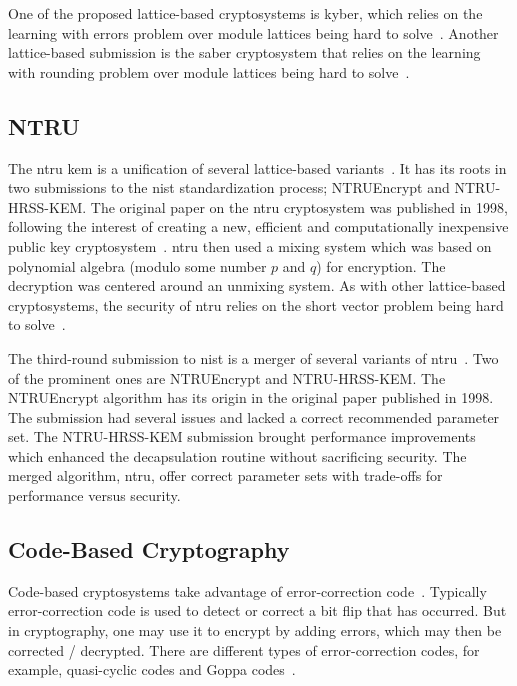 One of the proposed lattice-based cryptosystems is \gls{kyber}, which relies on the learning with errors problem over module lattices being hard to solve~\cite{kyber2021}. Another lattice-based submission is the \gls{saber} cryptosystem that relies on the learning with rounding problem over module lattices being hard to solve~\cite{saber}.

\subsection{NTRU}

The \gls{ntru} \gls{kem} is a unification of several lattice-based variants~\cite{ntru2020}. It has its roots in two submissions to the \gls{nist} standardization process; NTRUEncrypt and NTRU-HRSS-KEM. The original paper on the \gls{ntru} cryptosystem was published in 1998, following the interest of creating a new, efficient and computationally inexpensive public key cryptosystem~\cite{ntru1998}. \gls{ntru} then used a mixing system which was based on polynomial algebra (modulo some number $p$ and $q$) for encryption. The decryption was centered around an unmixing system. As with other lattice-based cryptosystems, the security of \gls{ntru} relies on the short vector problem being hard to solve~\cite{sun2020, ntru1998}.

The third-round submission to \gls{nist} is a merger of several variants of \gls{ntru}~\cite{ntru2020}. Two of the prominent ones are NTRUEncrypt and NTRU-HRSS-KEM. The NTRUEncrypt algorithm has its origin in the original paper published in 1998. The submission had several issues and lacked a correct recommended parameter set. The NTRU-HRSS-KEM submission brought performance improvements which enhanced the decapsulation routine without sacrificing security. The merged algorithm, \gls{ntru}, offer correct parameter sets with trade-offs for performance versus security.

\subsection{Code-Based Cryptography}
Code-based cryptosystems take advantage of error-correction code~\cite{bernstein2017}. Typically error-correction code is used to detect or correct a bit flip that has occurred. But in cryptography, one may use it to encrypt by adding errors, which may then be corrected / decrypted. There are different types of error-correction codes, for example, quasi-cyclic codes and Goppa codes~\cite{sendrier2011}.

